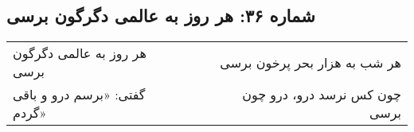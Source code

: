 \begin{center}
\section*{شماره ۳۶: هر روز به عالمی دگرگون برسی}
\label{sec:036}
\begin{longtable}{l p{0.5cm} r}
هر روز به عالمی دگرگون برسی
&&
هر شب به هزار بحر پرخون برسی
\\
گفتی: «برسم درو و باقی گردم»
&&
چون کس نرسد درو، درو چون برسی
\\
\end{longtable}
\end{center}
